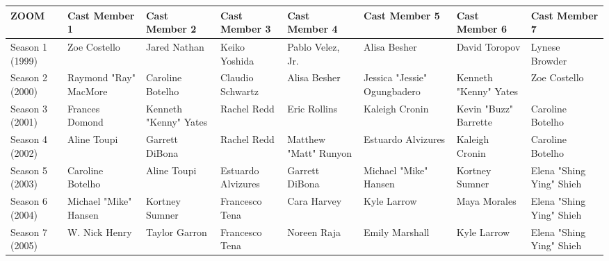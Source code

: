 \documentclass{article}
\begin{document}
\begin{tabular}{llllllll}
\toprule
ZOOM & Cast Member 1 & Cast Member 2 & Cast Member 3 & Cast Member 4 & Cast Member 5 & Cast Member 6 & Cast Member 7 \\
\midrule
Season 1 (1999) & Zoe Costello & Jared Nathan & Keiko Yoshida & Pablo Velez, Jr. & Alisa Besher & David Toropov & Lynese Browder \\
Season 2 (2000) & Raymond "Ray" MacMore & Caroline Botelho & Claudio Schwartz & Alisa Besher & Jessica "Jessie" Ogungbadero & Kenneth "Kenny" Yates & Zoe Costello \\
Season 3 (2001) & Frances Domond & Kenneth "Kenny" Yates & Rachel Redd & Eric Rollins & Kaleigh Cronin & Kevin "Buzz" Barrette & Caroline Botelho \\
Season 4 (2002) & Aline Toupi & Garrett DiBona & Rachel Redd & Matthew "Matt" Runyon & Estuardo Alvizures & Kaleigh Cronin & Caroline Botelho \\
Season 5 (2003) & Caroline Botelho & Aline Toupi & Estuardo Alvizures & Garrett DiBona & Michael "Mike" Hansen & Kortney Sumner & Elena "Shing Ying" Shieh \\
Season 6 (2004) & Michael "Mike" Hansen & Kortney Sumner & Francesco Tena & Cara Harvey & Kyle Larrow & Maya Morales & Elena "Shing Ying" Shieh \\
Season 7 (2005) & W. Nick Henry & Taylor Garron & Francesco Tena & Noreen Raja & Emily Marshall & Kyle Larrow & Elena "Shing Ying" Shieh \\
\bottomrule
\end{tabular}
\end{document}
